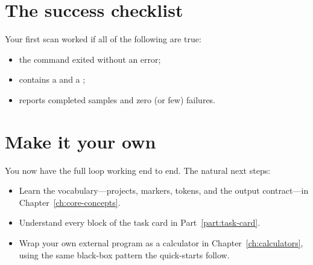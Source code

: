 \section{The success checklist}
\label{sec:success-check}

Your first scan worked if all of the following are true:

\begin{itemize}
  \item the command exited without an error;
  \item {} contains a  and a ;
  \item {} reports completed samples and zero (or few) failures.
\end{itemize}

\section{Make it your own}
\label{sec:make-your-own}

You now have the full loop working end to end. The natural next steps:

\begin{itemize}
  \item Learn the vocabulary---projects, markers, tokens, and the output
        contract---in Chapter~\ref{ch:core-concepts}.
  \item Understand every block of the task card in Part~\ref{part:task-card}.
  \item Wrap your own external program as a calculator in Chapter~\ref{ch:calculators}, using
        the same black-box pattern the quick-starts follow.
\end{itemize}
